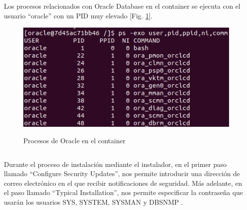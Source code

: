 \documentclass[10pt,a4paper]{article}
\begin{document}
\subsection{}
Los procesos relacionados con Oracle Database en el container se ejecuta con el usuario ``oracle'' con un PID muy elevado [Fig. \ref{fig:oracle_perm}].
\begin{figure}[h!]
  \centering
  \includegraphics[scale=0.5]{oracle_perm.png}\\
  \caption{Procesos de Oracle en el container}
  \label{fig:oracle_perm}
\end{figure}

\pagebreak
\subsection{}

Durante el proceso de instalación mediante el instalador, en el primer paso llamado ``Configure Security Updates'', nos permite introducir una dirección de correo electrónico en el que recibir notificaciones de seguridad. Más adelante, en el paso llamado ``Typical Installation'', nos permite especificar la contraseña que usarán los usuarios SYS, SYSTEM, SYSMAN y DBSNMP \cite{install_oracle}.
\end{document}
